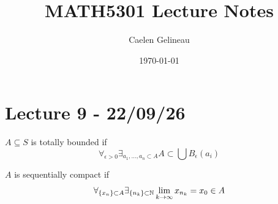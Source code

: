 \documentclass[11pt]{article}
\begin{document}
\title{MATH5301 Lecture Notes}
\author{Caelen Gelineau}
\date{\today}
\maketitle
\tableofcontents
\newpage

\section{Lecture 9 - 22/09/26}
\begin{definition}
    $A \subseteq  S$ is totally bounded if 
    \[
        \forall_{\epsilon>0}\exists_{a_1, \dots, a_n \subset A} A \subset \bigcup B_{\epsilon}(a_i)
    \]
    
\end{definition}
\begin{definition}
    $A$ is sequentially compact if 
    \[
        \forall_{ \{x_n\} \subset A }\exists_{\{n_k \}\subset \mathbb{N}} \lim_{k \to \infty} x_{n_k} = x_0 \in A
    \]
\end{definition}
\end{document}
